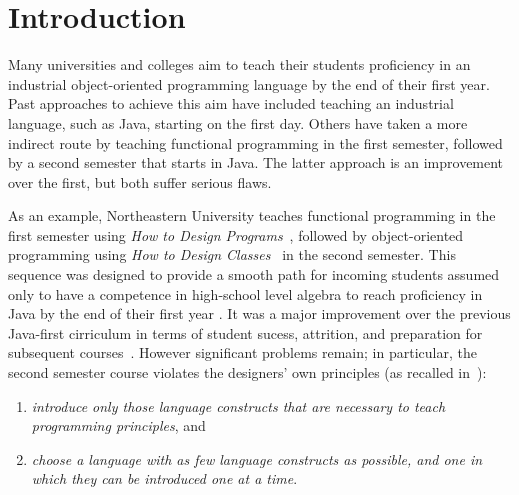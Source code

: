 \documentclass[submission,copyright]{eptcs}
\title{\thetitle}
\author{Sam Tobin-Hochstadt \quad\qquad David Van Horn
\institute{Northeastern University\\
Boston, Massachusetts, USA}
\email{\{samth,dvanhorn\}@ccs.neu.edu}
}
\begin{document}
\maketitle

\begin{abstract}
We propose a bridge between functional and object-oriented programming
in the first-year cirriculum.
\end{abstract}

\section{Introduction}

Many universities and colleges aim to teach their students proficiency
in an industrial object-oriented programming language by the end of
their first year.  Past approaches to achieve this aim have included
teaching an industrial language, such as Java, starting on the first
day.  Others have taken a more indirect route by teaching functional
programming in the first semester, followed by a second semester that
starts in Java.  The latter approach is an improvement over the first,
but both suffer serious flaws.

As an example, Northeastern University teaches functional programming
in the first semester using \emph{How to Design
  Programs}~\cite{dvanhorn:Felleisen2001How}, followed by
object-oriented programming using \emph{How to Design
  Classes}~\cite{local:htdc} in the second semester.  This sequence
was designed to provide a smooth path for incoming students assumed
only to have a competence in high-school level algebra to reach
proficiency in Java by the end of their first year
\cite{dvanhorn:Felleisen2004Structure}.  It was a major improvement
over the previous Java-first cirriculum in terms of student sucess,
attrition, and preparation for subsequent
courses~\cite{dvanhorn:Proulx2006Design}.  However significant
problems remain; in particular, the second semester course violates
the designers' own principles (as recalled
in~\cite{dvanhorn:Bloch2000Scheme}):
%
\begin{enumerate}
\item \emph{introduce only those language constructs that are necessary to
  teach programming principles}, and
\item \emph{choose a language with as
  few language constructs as possible, and one in which they can be
  introduced one at a time}.
\end{enumerate}
\end{document}
